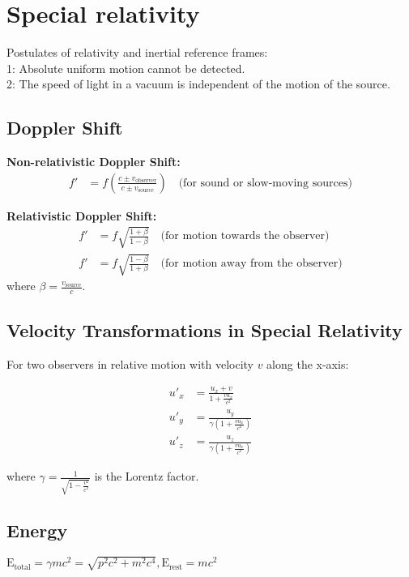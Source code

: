 \documentclass[12pt,a4paper]{article}
\begin{document}
	\section*{Special relativity}
	Postulates of relativity and inertial reference frames:\\
	1: Absolute uniform motion cannot be detected.\\
	2: The speed of light in a vacuum is independent of the motion of the source.\\
	
	\subsection*{Doppler Shift}
	
	\textbf{Non-relativistic Doppler Shift:}
	\begin{align}
		f' &= f \left( \frac{c \pm v_{\text{observer}}}{c \pm v_{\text{source}}} \right) \quad \text{(for sound or slow-moving sources)}
	\end{align}
	
	\textbf{Relativistic Doppler Shift:}
	\begin{align}
		f' &= f \sqrt{\frac{1 + \beta}{1 - \beta}} \quad \text{(for motion towards the observer)} \\
		f' &= f \sqrt{\frac{1 - \beta}{1 + \beta}} \quad \text{(for motion away from the observer)}
	\end{align}
	where \( \beta = \frac{v_{\text{source}}}{c} \).
	
	\subsection*{Velocity Transformations in Special Relativity}
	
	For two observers in relative motion with velocity \( v \) along the x-axis:
	
	\begin{align}
		u'_{x} &= \frac{u_{x} + v}{1 + \frac{vu_{x}}{c^2}} \\
		u'_{y} &= \frac{u_{y}}{\gamma(1 + \frac{vu_{x}}{c^2})} \\
		u'_{z} &= \frac{u_{z}}{\gamma(1 + \frac{vu_{x}}{c^2})}
	\end{align}
	
	where \( \gamma = \frac{1}{\sqrt{1 - \frac{v^2}{c^2}}} \) is the Lorentz factor.
	
	\subsection*{Energy}
	$\text{E}_\text{total} = \gamma mc^2 = \sqrt{p^2c^2 + m^2c^4}, \text{E}_\text{rest} = mc^2$
	
\end{document}
